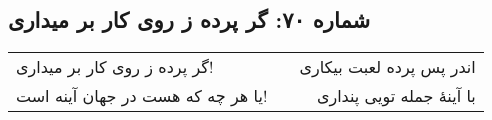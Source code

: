 \begin{center}
\section*{شماره ۷۰: گر پرده ز روی کار بر میداری}
\label{sec:070}
\begin{longtable}{l p{0.5cm} r}
گر پرده ز روی کار بر میداری!
&&
اندر پس پرده لعبت بیکاری
\\
یا هر چه که هست در جهان آینه است!
&&
با آینهٔ جمله تویی پنداری
\\
\end{longtable}
\end{center}
